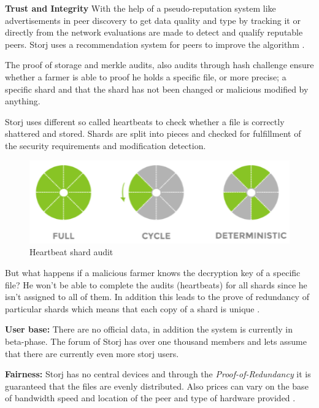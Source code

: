 \textbf{Trust and Integrity} With the help of a pseudo-reputation system like advertisements in peer discovery to get data quality and type by tracking it or directly from the network evaluations are made to detect and qualify reputable peers. Storj uses a recommendation system for peers to improve the algorithm \cite{storj:PDF}.

The proof of storage and merkle audits, also audits through hash challenge ensure whether a farmer is able to proof he holds a specific file, or more precise; a specific shard and that the shard has not been changed or malicious modified by anything.

Storj uses different so called heartbeats to check whether a file is correctly shattered and stored. Shards are split into pieces and checked for fulfillment of the security requirements and modification detection. 

	\begin{figure}[ht]
		\begin{center}
		\includegraphics[scale=0.8]{Talk5/storj_heartbeat.PNG}
		\end{center}
		\caption{Heartbeat shard audit \cite{storj:PDF}}
		\label{storj_heartbeat}
	\end{figure}

But what happens if a malicious farmer knows the decryption key of a specific file? He won't be able to complete the audits (heartbeats) for all shards since he isn't assigned to all of them. In addition this leads to the prove of redundancy of particular shards which means that each copy of a shard is unique \cite{storj:PDF}.

\textbf{User base:} There are no official data, in addition the system is currently in beta-phase. The forum of Storj has over one thousand members \cite{storj:forum} and lets assume that there are currently even more storj users.

\textbf{Fairness:} Storj has no central devices and through the \textit{Proof-of-Redundancy} it is guaranteed that the files are evenly distributed. Also prices can vary on the base of bandwidth speed and location of the peer and type of hardware provided \cite{storj:PDF}.

